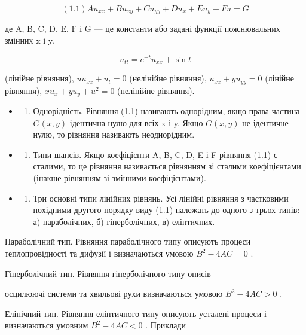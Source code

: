 \documentclass[
  ukrainian,
]{article}
\providecommand{\tightlist}{%
  \setlength{\itemsep}{0pt}\setlength{\parskip}{0pt}}
\begin{document}
\[
(1.1) Au_{xx} + Bu_{xy} + Cu_{yy} + Du_x + Eu_y + Fu = G
\]

де A, B, C, D, E, F і G --- це константи або задані функції
пояснювальних змінних x і y.

\[
u_{tt} = e^{-t}u_{xx} + \sin t
\]

(лінійне рівняння), \(uu_{xx} + u_t = 0\) (нелінійне рівняння),
\(u_{xx} + yu_{yy} = 0\) (лінійне рівняння), \(xu_x + yu_y + u^2 = 0\)
(нелінійне рівняння).

\begin{itemize}
\tightlist
\item
  \begin{enumerate}
  \def\labelenumi{\arabic{enumi}.}
  \setcounter{enumi}{3}
  \tightlist
  \item
    Однорідність. Рівняння (1.1) називають однорідним, якщо права
    частина \(G(x, y)\) ідентична нулю для всіх x і y. Якщо \(G(x, y)\)
    не ідентичне нулю, то рівняння називають неоднорідним.
  \end{enumerate}
\item
  \begin{enumerate}
  \def\labelenumi{\arabic{enumi}.}
  \setcounter{enumi}{4}
  \tightlist
  \item
    Типи шансів. Якщо коефіцієнти A, B, C, D, E і F рівняння (1.1) є
    сталими, то це рівняння називається рівнянням зі сталими
    коефіцієнтами (інакше рівнянням зі змінними коефіцієнтами).
  \end{enumerate}
\item
  \begin{enumerate}
  \def\labelenumi{\arabic{enumi}.}
  \setcounter{enumi}{5}
  \tightlist
  \item
    Три основні типи лінійних рівнянь. Усі лінійні рівняння з частковими
    похідними другого порядку виду (1.1) належать до одного з трьох
    типів: а) параболічних, б) гіперболічних, в) еліптичних.
  \end{enumerate}
\end{itemize}

Параболічний тип. Рівняння параболічного типу описують процеси
теплопровідності та дифузії і визначаються умовою \(B^2 - 4AC = 0\) .

Гіперболічний тип. Рівняння гіперболічного типу описів

осцилюючі системи та хвильові рухи визначаються умовою \(B^2-4AC>0\) .

Еліпічний тип. Рівняння еліптичного типу описують усталені процеси і
визначаються умовним \(B^2-4AC<0\) . Приклади
\end{document}
